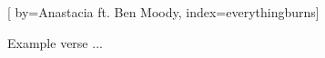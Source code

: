 
[%
    by={Anastacia ft. Ben Moody},
    index={everythingburns}]


    \label{everythingburns}

    \beginverse
        Example verse ...
    \endverse
\endsong
